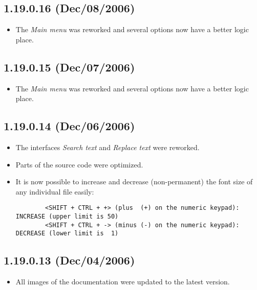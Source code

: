 \subsection*{1.19.0.16 (Dec/08/2006)}
\begin{itemize}
  \item The \textit{Main menu} was reworked and several options now
    have a better logic place.
\end{itemize}


\subsection*{1.19.0.15 (Dec/07/2006)}
\begin{itemize}
  \item The \textit{Main menu} was reworked and several
    options now have a better logic place.
\end{itemize}


\subsection*{1.19.0.14 (Dec/06/2006)}
\begin{itemize}
  \item The interfaces \textit{Search text} and \textit{Replace text} were reworked.
  \item Parts of the source code were optimized.
  \item It is now possible to increase and decrease (non-permanent)
    the font size of any individual file easily:

    \begin{footnotesize}
      \begin{verbatim}
        <SHIFT + CTRL + +> (plus  (+) on the numeric keypad): INCREASE (upper limit is 50)
        <SHIFT + CTRL + -> (minus (-) on the numeric keypad): DECREASE (lower limit is  1)
      \end{verbatim}
    \end{footnotesize}

\end{itemize}


\subsection*{1.19.0.13 (Dec/04/2006)}
\begin{itemize}
  \item All images of the documentation were updated to the latest version.
\end{itemize}


